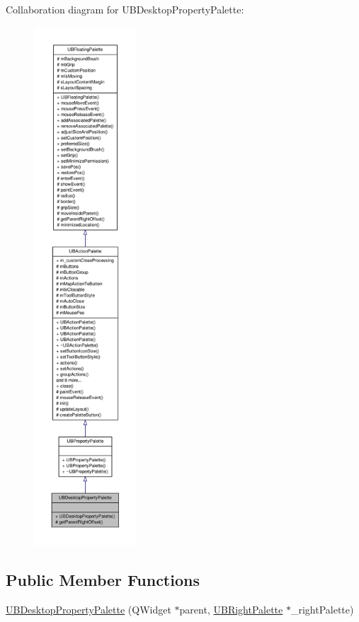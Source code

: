 Collaboration diagram for U\-B\-Desktop\-Property\-Palette\-:
\nopagebreak
\begin{figure}[H]
\begin{center}
\leavevmode
\includegraphics[height=550pt]{d9/dd6/class_u_b_desktop_property_palette__coll__graph}
\end{center}
\end{figure}
\subsection*{Public Member Functions}
\begin{DoxyCompactItemize}
\item 
\hyperlink{class_u_b_desktop_property_palette_a9d316939376b30c5835b08faf0d6fc88}{U\-B\-Desktop\-Property\-Palette} (Q\-Widget $\ast$parent, \hyperlink{class_u_b_right_palette}{U\-B\-Right\-Palette} $\ast$\-\_\-right\-Palette)
\end{DoxyCompactItemize}

